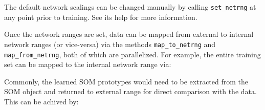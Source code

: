 \documentclass[]{article}
\newenvironment{Shaded}{\begin{snugshade}}{\end{snugshade}}
\newcommand{\CommentTok}[1]{\textcolor[rgb]{0.56,0.35,0.01}{\textit{#1}}}
\newcommand{\KeywordTok}[1]{\textcolor[rgb]{0.13,0.29,0.53}{\textbf{#1}}}
\newcommand{\NormalTok}[1]{#1}
\newcommand{\OperatorTok}[1]{\textcolor[rgb]{0.81,0.36,0.00}{\textbf{#1}}}
\newcommand{\StringTok}[1]{\textcolor[rgb]{0.31,0.60,0.02}{#1}}
\begin{document}
\begin{Shaded}
\end{Shaded}

The default network scalings can be changed manually by calling \texttt{set\_netrng} at any point prior to training. See its help for more information.

Once the network ranges are set, data can be mapped from external to internal network ranges (or vice-versa) via the methods \texttt{map\_to\_netrng} and \texttt{map\_from\_netrng}, both of which are parallelized. For example, the entire training set can be mapped to the internal network range via:

\begin{Shaded}
\end{Shaded}

Commonly, the learned SOM prototypes would need to be extracted from the SOM object and returned to external range for direct comparison with the data. This can be achived by:

\begin{Shaded}
\end{Shaded}
\end{document}
